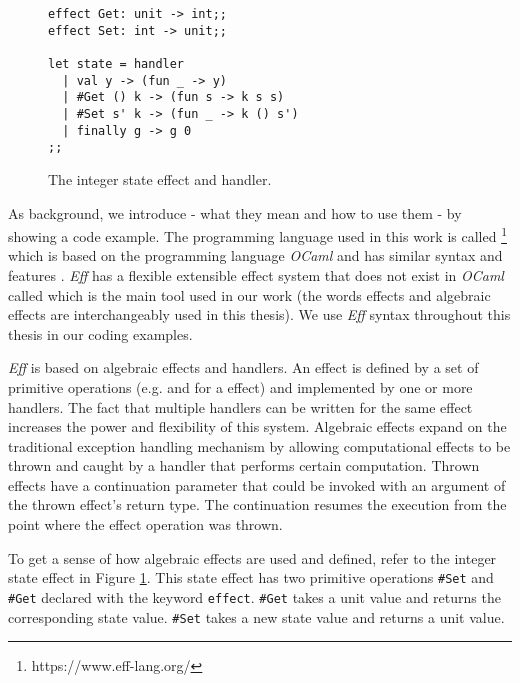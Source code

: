 \begin{figure}[!htb]
  \centering
  \begin{lstlisting}[linewidth=.9\textwidth]
effect Get: unit -> int;;
effect Set: int -> unit;;

let state = handler
  | val y -> (fun _ -> y)
  | #Get () k -> (fun s -> k s s)
  | #Set s' k -> (fun _ -> k () s')
  | finally g -> g 0
;;
\end{lstlisting}
  \caption{The integer state effect and handler.}
  \label{fig:state-effect}
\end{figure}
%
As background, we introduce  - what they mean and how to use them - by showing a code example. The programming language used in this work is called \footnote{https://www.eff-lang.org/} which is based on the programming language \emph{OCaml} and has similar syntax and features \cite{Pretnar15}. \emph{Eff} has a flexible extensible effect system that does not exist in \emph{OCaml} called  which is the main tool used in our work (the words effects and algebraic effects are interchangeably used in this thesis). We use \emph{Eff} syntax throughout this thesis in our coding examples. 

\emph{Eff} is based on algebraic effects and handlers. An effect is defined by a set of primitive operations (e.g.  and  for a  effect) and implemented by one or more handlers. The fact that multiple handlers can be written for the same effect increases the power and flexibility of this system. Algebraic effects expand on the traditional exception handling mechanism by allowing computational effects to be thrown and caught by a handler that performs certain computation. Thrown effects have a continuation parameter that could be invoked with an argument of the thrown effect's return type. The continuation resumes the execution from the point where the effect operation was thrown.  

To get a sense of how algebraic effects are used and defined, refer to the integer state effect \cite{Pretnar15} in Figure \ref{fig:state-effect}. This state effect has two primitive operations \texttt{\#Set} and \texttt{\#Get} declared with the keyword \texttt{effect}. \texttt{\#Get} takes a unit value and returns the corresponding state value. \texttt{\#Set} takes a new state value and returns a unit value.

